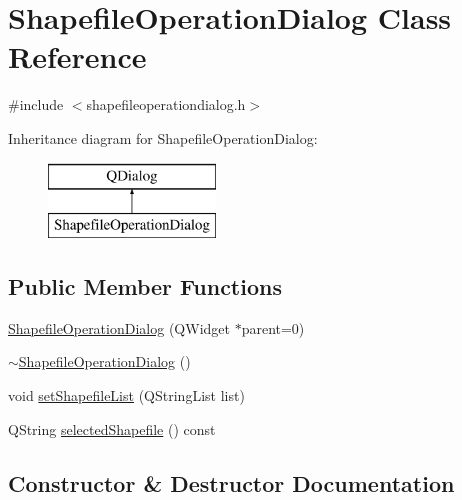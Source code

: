 \hypertarget{class_shapefile_operation_dialog}{}\section{Shapefile\+Operation\+Dialog Class Reference}
\label{class_shapefile_operation_dialog}


{\ttfamily \#include $<$shapefileoperationdialog.\+h$>$}

Inheritance diagram for Shapefile\+Operation\+Dialog\+:\begin{figure}[H]
\begin{center}
\leavevmode
\includegraphics[height=2.000000cm]{dd/d60/class_shapefile_operation_dialog}
\end{center}
\end{figure}
\subsection*{Public Member Functions}
\begin{DoxyCompactItemize}
\item 
\mbox{\hyperlink{class_shapefile_operation_dialog_ae60ded569c813e28ce14b8073d1d22e5}{Shapefile\+Operation\+Dialog}} (Q\+Widget $\ast$parent=0)
\item 
\mbox{\hyperlink{class_shapefile_operation_dialog_a41f7a5f3970c7d1059b4bb3f030485d7}{$\sim$\+Shapefile\+Operation\+Dialog}} ()
\item 
void \mbox{\hyperlink{class_shapefile_operation_dialog_a7c8834c2eefdb7742f31f61f5955bfb6}{set\+Shapefile\+List}} (Q\+String\+List list)
\item 
Q\+String \mbox{\hyperlink{class_shapefile_operation_dialog_ad507475696bfa9d00385a7e6c4ed12bf}{selected\+Shapefile}} () const
\end{DoxyCompactItemize}


\subsection{Constructor \& Destructor Documentation}
\mbox{\label{class_shapefile_operation_dialog_ae60ded569c813e28ce14b8073d1d22e5}} 

